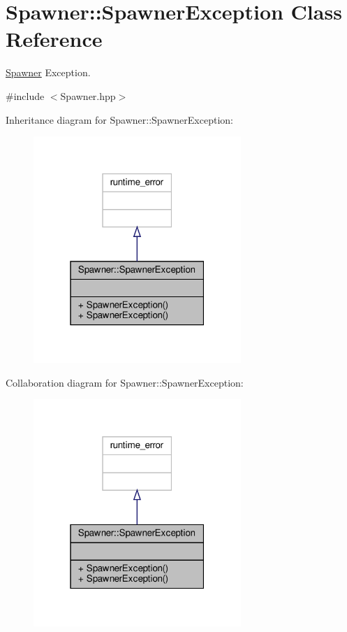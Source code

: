 \hypertarget{class_spawner_1_1_spawner_exception}{}\section{Spawner\+:\+:Spawner\+Exception Class Reference}
\label{class_spawner_1_1_spawner_exception}


\hyperlink{class_spawner}{Spawner} Exception.  




{\ttfamily \#include $<$Spawner.\+hpp$>$}



Inheritance diagram for Spawner\+:\+:Spawner\+Exception\+:
\nopagebreak
\begin{figure}[H]
\begin{center}
\leavevmode
\includegraphics[width=223pt]{class_spawner_1_1_spawner_exception__inherit__graph}
\end{center}
\end{figure}


Collaboration diagram for Spawner\+:\+:Spawner\+Exception\+:
\nopagebreak
\begin{figure}[H]
\begin{center}
\leavevmode
\includegraphics[width=223pt]{class_spawner_1_1_spawner_exception__coll__graph}
\end{center}
\end{figure}
